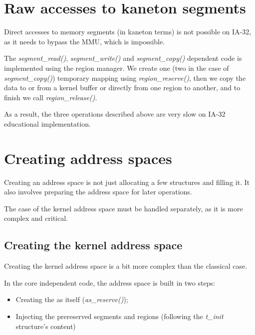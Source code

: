 %
%

\section{Raw accesses to kaneton segments}

Direct accesses to memory segments (in kaneton terms) is not possible
on IA-32, as it needs to bypass the MMU, which is impossible.

The \textit{segment\_read()}, \textit{segment\_write()} and
\textit{segment\_copy()} dependent code is implemented using the
region manager. We create one (two in the case of
\textit{segment\_copy()}) temporary mapping using
\textit{region\_reserve()}, then we copy the data to or from a kernel
buffer or directly from one region to another, and to finish we call
\textit{region\_release()}.

As a result, the three operations described above are very slow on
IA-32 educational implementation.

%
%

\section{Creating address spaces}

Creating an address space is not just allocating a few structures and
filling it. It also involves preparing the address space for later
operations.

The case of the kernel address space must be handled separately, as it
is more complex and critical.

%
%

\subsection{Creating the kernel address space}

Creating the kernel address space is a bit more complex than the
classical case.

In the core independent code, the address space is built in two steps:

\begin{itemize}
\item
  Creating the as itself (\textit{as\_reserve()});
\item
  Injecting the prereserved segments and regions (following the
  \textit{t\_init} structure's content)
\end{itemize}

